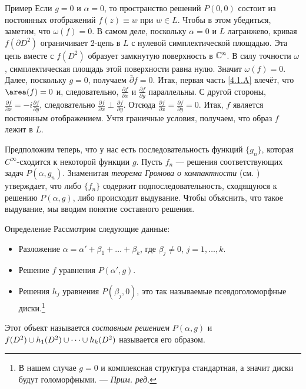 \begin{ex*}{Пример}
Если $g = 0$ и $\alpha = 0$, то пространство решений $P (0, 0)$ состоит из постоянных отображений $f (z) \equiv w$ при $w \in L$.
Чтобы в этом убедиться, заметим, что $\omega (f) = 0$.
В самом деле, поскольку $\alpha = 0$ и $L$ лагранжево, кривая $f (\partial D^2)$ ограничивает 2-цепь в $L$ с нулевой симплектической площадью.
Эта цепь вместе с $f (D^2)$ образует замкнутую поверхность в $\mathbb{C}^n$.
В силу точности $\omega$, симплектическая площадь этой поверхности равна нулю.
Значит $\omega (f) = 0$.
Далее, поскольку $g = 0$, получаем $\bar\partial f=0$.
Итак, первая часть \ref{4.1.A} влечёт, что $\area (f) = 0$ и, следовательно, $\tfrac{\partial f}{\partial x}$ и $\tfrac{\partial f}{\partial y}$ параллельны.
С другой стороны, $\tfrac{\partial f}{\partial x}=-i\tfrac{\partial f}{\partial y}$,
следовательно $\tfrac{\partial f}{\partial x}\perp\tfrac{\partial f}{\partial y}$.
Отсюда $\tfrac{\partial f}{\partial x}=\tfrac{\partial f}{\partial y}=0$.
Итак, $f$ является постоянным отображением.
Учтя граничные условия, получаем, что образ $f$ лежит в $L$.
\end{ex*}

Предположим теперь, что у нас есть последовательность функций
$\{g_n\}$, которая $C^\infty$-сходится к некоторой функции $g$. 
Пусть $f_n$ — решения соответствующих задач $P(\alpha, g_n)$.
Знаменитая \emph{теорема Громова о компактности} (см. \cite{G1,AL})
утверждает, что либо $\{f_n\}$ содержит подпоследовательность,
сходящуюся к решению $P (\alpha, g)$, либо происходит выдувание.
Чтобы объяснить, что такое выдувание, мы вводим понятие составного решения. 

\begin{ex*}{Определение}
Рассмотрим следующие данные:
\begin{itemize}
\item Разложение $\alpha = \alpha' + \beta_1 +\dots + \beta_k$, где $\beta_j \ne 0$, $j = 1,\dots,k$.
\item Решение $f$ уравнения $P (\alpha', g)$.
\item Решения $h_j$ уравнения  $P (\beta_j, 0)$, это так называемые
  псевдоголоморфные диски.\footnote{В нашем случае $g=0$ и комплексная структура стандартная, а значит диски будут голоморфными. — \textit{Прим. ред.}}
\end{itemize}
Этот объект называется \emph{составным решением} $P(\alpha,g)$ и 
$f(D^2)\z\cup h_1(D^2) \z\cup\dots\cup h_k (D^2)$ называется его образом.
\end{ex*}

